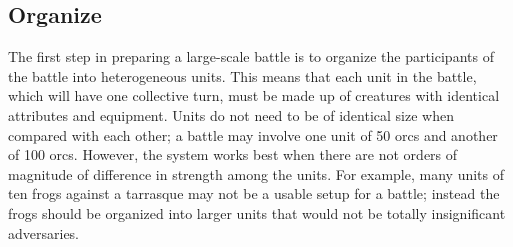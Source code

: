 \subsection{Organize}

The first step in preparing a large-scale battle is to organize the participants of the battle into heterogeneous units.
This means that each unit in the battle, which will have one collective turn,
must be made up of creatures with identical attributes and equipment.
Units do not need to be of identical size when compared with each other;
a battle may involve one unit of 50 orcs and another of 100 orcs.
However, the system works best when there are not orders of magnitude
of difference in strength among the units.
For example, many units of ten frogs against a tarrasque
may not be a usable setup for a battle;
instead the frogs should be organized into larger units
that would not be totally insignificant adversaries.